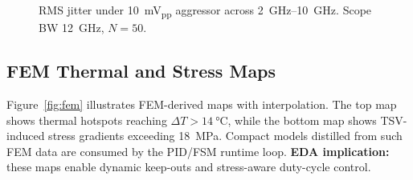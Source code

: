 \documentclass[conference]{IEEEtran}
\begin{document}
\begin{figure}[t]
\centering
{}
\caption{RMS jitter under \SI{10}{mV_{pp}} aggressor across \SIrange{2}{10}{GHz}. Scope BW \SI{12}{GHz}, $N=50$.}
\label{fig:emi}
\end{figure}

\subsection{FEM Thermal and Stress Maps}
Figure~\ref{fig:fem} illustrates FEM-derived maps with interpolation.  
The top map shows thermal hotspots reaching $\Delta T>\SI{14}{\celsius}$, while the bottom map shows TSV-induced stress gradients exceeding \SI{18}{MPa}. Compact models distilled from such FEM data are consumed by the PID/FSM runtime loop.  
\textbf{EDA implication:} these maps enable dynamic keep-outs and stress-aware duty-cycle control.
\end{document}
